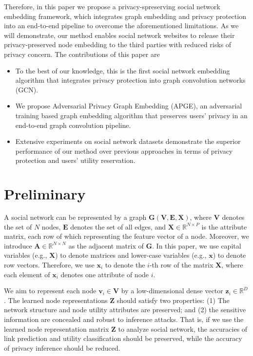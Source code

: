 \documentclass{article}
\begin{document}
Therefore, in this paper we propose a privacy-spreserving social network embedding framework, which integrates graph embedding and privacy protection into an end-to-end pipeline to overcome the aforementioned limitations. As we will demonstrate, our method enables social network websites to release their privacy-preserved node embedding to the third parties with reduced risks of privacy concern. The contributions of this paper are
\begin{itemize}
\item To the best of our knowledge, this is the first social network embedding algorithm that integrates privacy protection into graph convolution networks (GCN).
\item We propose Adversarial Privacy Graph Embedding (APGE), an adversarial training based graph embedding algorithm that preserves users' privacy in an end-to-end graph convolution pipeline.
\item Extensive experiments on social network datasets demonstrate the superior performance of our method over previous approaches in terms of privacy protection and users' utility reservation.
\end{itemize}


\section{Preliminary}
A social network can be represented by a graph $\mathbf{G}(\mathbf{V},\mathbf{E},\mathbf{X})$, where $\mathbf{V}$ denotes the set of $N$ nodes, $\mathbf{E}$ denotes the set of all edges, and $\mathbf{X} \in \mathbb{R}^{N \times P}$ is the attribute matrix, each row of which representing the feature vector of a node. Moreover, we introduce $\mathbf{A} \in \mathbb{R}^{N \times N}$ as the adjacent  matrix  of $\mathbf{G}$. In this paper, we use capital variables (e.g., $\mathbf{X}$) to denote matrices and lower-case variables (e.g., $\mathbf{x} $) to denote row vectors. Therefore, we use $\mathbf{x}_i$ to denote the $i$-th row of the matrix $\mathbf{X}$, where each element of $\mathbf{x}_i$ denotes one attribute of node $i$.

We aim to represent each node $\mathbf{v}_i \in \mathbf{V}$ by a low-dimensional dense vector $\mathbf{z}_i\in\mathbb{R}^{D}$. The learned node representations $\mathbf{Z}$ should satisfy two properties: (1) The network structure and node utility attributes are preserved; and (2) the sensitive information are concealed and robust to inference attacks. That is, if we use the learned node representation matrix $\mathbf{Z}$ to analyze social network, the accuracies of link prediction and utility classification should be preserved, while the accuracy of privacy inference should be reduced.
\end{document}
